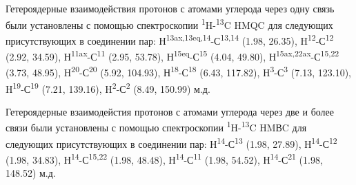 \begin{multicols}{2}
Гетероядерные взаимодействия протонов с атомами углерода через одну
связь были установлены с помощью спектроскопии
\textsuperscript{1}H-\textsuperscript{13}C HMQC для следующих
присутствующих в соединении пар:
Н\textsuperscript{13ax,13eq,14}-С\textsuperscript{13,14} (1.98, 26.35),
H\textsuperscript{12}-С\textsuperscript{12} (2.92, 34.59),
Н\textsuperscript{11ax}-С\textsuperscript{11} (2.95, 53.78),
Н\textsuperscript{15eq}-С\textsuperscript{15} (4.04, 49.80),
Н\textsuperscript{15ax,22ax}-С\textsuperscript{15,22} (3.73, 48.95),
H\textsuperscript{20}-С\textsuperscript{20} (5.92, 104.93),
Н\textsuperscript{18}-С\textsuperscript{18} (6.43, 117.82),
H\textsuperscript{3}-С\textsuperscript{3} (7.13, 123.10),
H\textsuperscript{19}-С\textsuperscript{19} (7.21, 139.16),
H\textsuperscript{2}-С\textsuperscript{2} (8.49, 150.99) м.д.

Гетероядерные взаимодейстия протонов с атомами углерода через две и
более связи были установлены с помощью спектроскопии
\textsuperscript{1}H-\textsuperscript{13}C HMВC для следующих
присутствующих в соединении пар:
Н\textsuperscript{14}-С\textsuperscript{13} (1.98, 27.89),
Н\textsuperscript{14}-С\textsuperscript{12} (1.98, 34.83),
Н\textsuperscript{14}-С\textsuperscript{15,22} (1.98, 48.48),
Н\textsuperscript{14}-С\textsuperscript{11} (1.98, 54.52),
Н\textsuperscript{14}-С\textsuperscript{21} (1.98, 148.52) м.д.
\end{multicols}

